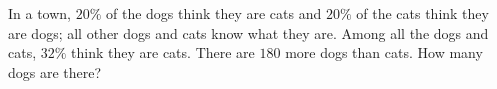 In a town, $20\%$ of the dogs think they are cats and $20\%$ of the cats think they are dogs; all other dogs and cats know what they are. Among all the dogs and cats, $32\%$ think they are cats. There are $180$ more dogs than cats. How many dogs are there?
